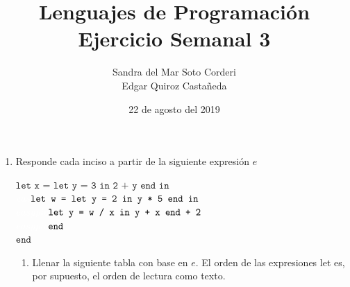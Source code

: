 \documentclass{article}
\begin{document}
    \title{
        Lenguajes de Programación \\
        Ejercicio Semanal 3
    }

    \author{
        Sandra del Mar Soto Corderi \\
        Edgar Quiroz Castañeda
    }

    \date{
        22 de agosto del 2019
    }
    
    \maketitle

    \begin{enumerate}
        \item {
            Responde cada inciso a partir de la siguiente expresión $e$
                            
            	$\texttt{let x = let y = 3 in 2 + y end in}$\\
            	$\textcolor{white}{eas}\texttt{let w = let y = 2 in y * 5 end in}$\\
            	$\textcolor{white}{easypie}\texttt{let y = w / x in y + x end + 2}$\\
            	$\textcolor{white}{easypie}\texttt{end}$\\
            	$\texttt{end}$\\
            
            
            \begin{enumerate}
            	\item { Llenar la siguiente tabla con base en $e$. El orden de las expresiones let es, por supuesto, el orden de lectura
            		como texto.
            		
}
\end{enumerate}}
\end{enumerate}
\end{document}
